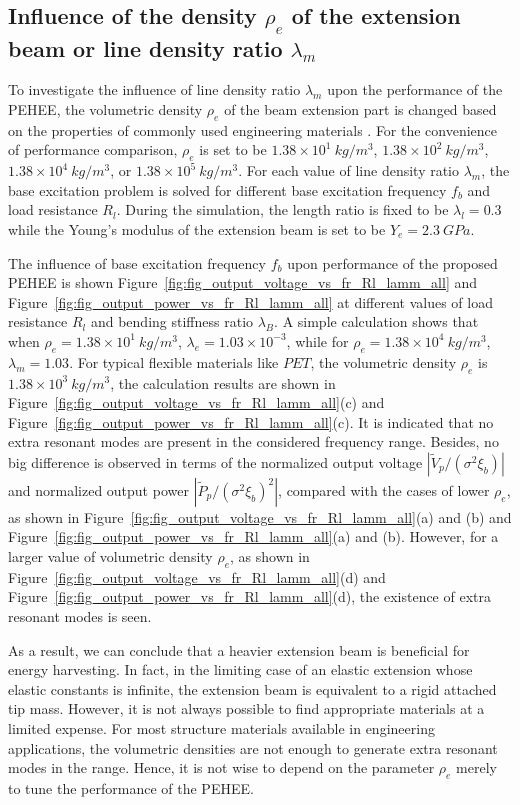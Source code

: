 \documentclass{elsarticle}
\begin{document}
\subsection{Influence of the density $\rho_e$ of the extension beam or line density ratio $\lambda_m$}

To investigate the influence of line density ratio $\lambda_m$ upon the performance of the PEHEE, the volumetric density $\rho_e$ of the beam extension part is changed based on the properties of commonly used engineering materials \cite{warlimont2018springer}. For the convenience of performance comparison, $\rho_e$ is set to be $1.38\times10^1\ kg/m^3$, $1.38\times10^2\ kg/m^3$, $1.38\times10^4\ kg/m^3$, or $1.38\times10^5\ kg/m^3$. For each value of line density ratio $\lambda_m$, the base excitation problem is solved for different base excitation frequency $f_b$ and load resistance $R_l$. During the simulation, the length ratio is fixed to be $\lambda_l = 0.3$ while the Young's modulus of the extension beam is set to be $Y_e = 2.3\ GPa$.

The influence of base excitation frequency $f_b$ upon performance of the proposed PEHEE is shown Figure~\ref{fig:fig_output_voltage_vs_fr_Rl_lamm_all} and Figure~\ref{fig:fig_output_power_vs_fr_Rl_lamm_all} at different values of load resistance $R_l$ and bending stiffness ratio $\lambda_B$. A simple calculation shows that when $\rho_e = 1.38\times10^1\ kg/m^3$, $\lambda_e = 1.03\times10^{-3}$, while for $\rho_e = 1.38\times10^4\ kg/m^3$, $\lambda_m = 1.03$. For typical flexible materials like $PET$\cite{dean1999lange}, the volumetric density $\rho_e$ is $1.38\times10^3\ kg/m^3$, the calculation results are shown in Figure~\ref{fig:fig_output_voltage_vs_fr_Rl_lamm_all}(c) and Figure~\ref{fig:fig_output_power_vs_fr_Rl_lamm_all}(c). It is indicated that no extra resonant modes are present in the considered frequency range. Besides, no big difference is observed in terms of the normalized output voltage $|\tilde{V}_p/(\sigma^2 \xi_b)|$ and normalized output power $|\tilde{P}_p/(\sigma^2 \xi_b)^2|$, compared with the cases of lower $\rho_e$, as shown in Figure~\ref{fig:fig_output_voltage_vs_fr_Rl_lamm_all}(a) and (b) and Figure~\ref{fig:fig_output_power_vs_fr_Rl_lamm_all}(a) and (b). However, for a larger value of volumetric density $\rho_e$, as shown in Figure~\ref{fig:fig_output_voltage_vs_fr_Rl_lamm_all}(d) and Figure~\ref{fig:fig_output_power_vs_fr_Rl_lamm_all}(d), the existence of extra resonant modes is seen. 

As a result, we can conclude that a heavier extension beam is beneficial for energy harvesting. In fact, in the limiting case of an elastic extension whose elastic constants is infinite, the extension beam is equivalent to a rigid attached tip mass. \cite{erturk2009experimentally} However, it is not always possible to find appropriate materials at a limited expense. For most structure materials available in engineering applications, the volumetric densities are not enough to generate extra resonant modes in the range. Hence, it is not wise to depend on the parameter $\rho_e$ merely to tune the performance of the PEHEE. 
\end{document}
